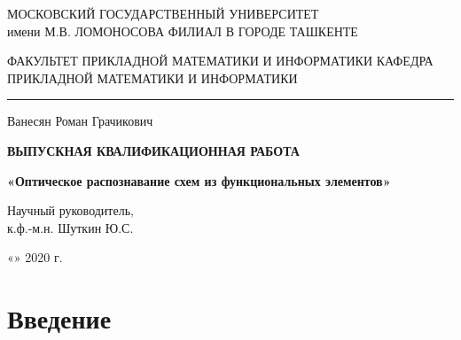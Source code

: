 \documentclass[makeidx, a4paper, 14pt]{extarticle}
\begin{document}
\begin{titlepage}
    \thispagestyle{fancy}
    \renewcommand{\headrulewidth}{0pt}
    \begin{center}
        МОСКОВСКИЙ ГОСУДАРСТВЕННЫЙ УНИВЕРСИТЕТ \\
        имени М.В. ЛОМОНОСОВА
        \medskip
        ФИЛИАЛ В ГОРОДЕ ТАШКЕНТЕ

        \bigskip
        \bigskip

        ФАКУЛЬТЕТ ПРИКЛАДНОЙ МАТЕМАТИКИ И ИНФОРМАТИКИ
        \medskip
        КАФЕДРА ПРИКЛАДНОЙ МАТЕМАТИКИ И ИНФОРМАТИКИ

        \bigskip
        \hrule
        \bigskip

        \large{Ванесян Роман Грачикович}

        \bigskip
        \bigskip

        \textbf{ВЫПУСКНАЯ КВАЛИФИКАЦИОННАЯ РАБОТА}

        \bigskip
        \bigskip

        \textbf{«Оптическое распознавание схем из функциональных элементов»}

        \bigskip
        \bigskip
        \bigskip
        \bigskip
        \bigskip
        \bigskip

        \begin{small}
            \begin{flushleft}
              Научный руководитель, \\
              к.ф.-м.н. \underline{\hspace{10cm}} Шуткин Ю.С.
            \end{flushleft}

            \smallskip

            \begin{flushright}
              «\underline{\hspace{1cm}}» \underline{\hspace{3.5cm}} 2020 г.
            \end{flushright}
        \end{small}

    \end{center}
\end{titlepage}

\tableofcontents
\newpage

\section{Введение}
\end{document}
